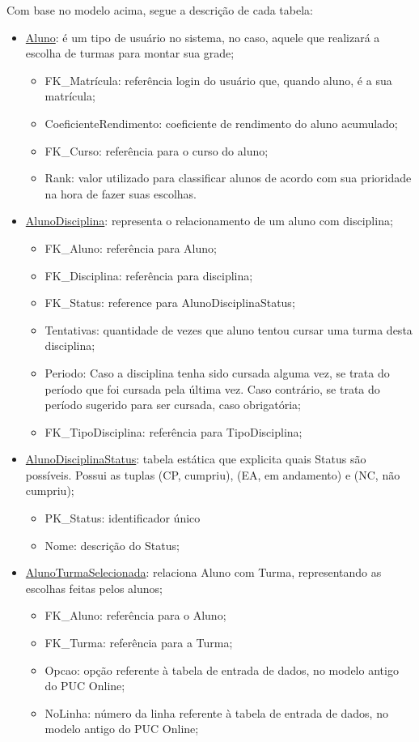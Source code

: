 \documentclass[graduacao,brazil]{ThesisPUC}
\begin{document}
Com base no modelo acima, segue a descrição de cada tabela:

\begin{itemize}

	\item \underline{Aluno}: é um tipo de usuário no sistema, no caso, aquele que realizará a escolha de turmas para montar sua grade;
	\begin{itemize}
		\item FK\_Matrícula: referência login do usuário que, quando aluno, é a sua matrícula;
		\item CoeficienteRendimento: coeficiente de rendimento do aluno acumulado;
		\item FK\_Curso: referência para o curso do aluno;
		\item Rank: valor utilizado para classificar alunos de acordo com sua prioridade na hora de fazer suas escolhas.
	\end{itemize}

	\item \underline{AlunoDisciplina}: representa o relacionamento de um aluno com disciplina;
	\begin{itemize}
		\item FK\_Aluno: referência para Aluno;
		\item FK\_Disciplina: referência para disciplina;
		\item FK\_Status: reference para AlunoDisciplinaStatus;
		\item Tentativas: quantidade de vezes que aluno tentou cursar uma turma desta disciplina;
		\item Periodo: Caso a disciplina tenha sido cursada alguma vez, se trata do período que foi cursada pela última vez. Caso contrário, se trata do período sugerido para ser cursada, caso obrigatória;
		\item FK\_TipoDisciplina: referência para TipoDisciplina;
	\end{itemize}

	\item \underline{AlunoDisciplinaStatus}: tabela estática que explicita quais Status são possíveis. Possui as tuplas (CP, cumpriu), (EA, em andamento) e (NC, não cumpriu);
	\begin{itemize}
		\item PK\_Status: identificador único
		\item Nome: descrição do Status;
	\end{itemize}

	\item \underline{AlunoTurmaSelecionada}: relaciona Aluno com Turma, representando as escolhas feitas pelos alunos;
	\begin{itemize}
		\item FK\_Aluno:  referência para o Aluno;
		\item FK\_Turma: referência para a Turma;
		\item Opcao: opção referente à tabela de entrada de dados, no modelo antigo do PUC Online;
		\item NoLinha: número da linha referente à tabela de entrada de dados, no modelo antigo do PUC Online;
	\end{itemize}


\end{itemize}
\end{document}
